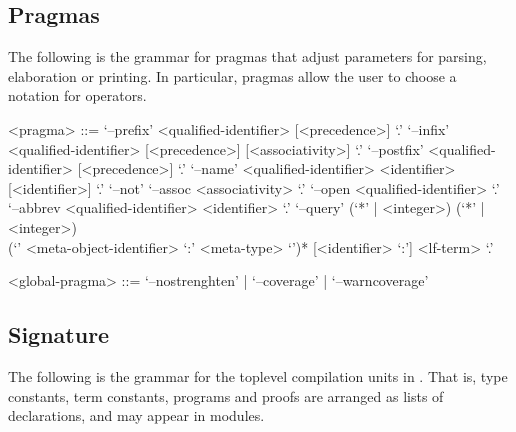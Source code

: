 \subsection{Pragmas}\label{section:syntax-pragmas}

The following is the grammar for pragmas that adjust parameters for parsing, elaboration or printing.
In particular, pragmas allow the user to choose a notation for operators.

\begin{grammar}
<pragma> ::= `--prefix' <qualified-identifier> [<precedence>] `.'
\alt `--infix' <qualified-identifier> [<precedence>] [<associativity>] `.'
\alt `--postfix' <qualified-identifier> [<precedence>] `.'
\alt `--name' <qualified-identifier> <identifier> [<identifier>] `.'
\alt `--not'
\alt `--assoc <associativity> `.'
\alt `--open <qualified-identifier> `.'
\alt `--abbrev <qualified-identifier> <identifier> `.'
\alt `--query' (`*' | <integer>) (`*' | <integer>)\\
(`{' <meta-object-identifier> `:' <meta-type> `}')* [<identifier> `:'] <lf-term> `.'

<global-pragma> ::= `--nostrenghten' | `--coverage' | `--warncoverage'
\end{grammar}

\subsection{Signature}\label{section:syntax-signature}

The following is the grammar for the toplevel compilation units in \Beluga.
That is, type constants, term constants, programs and proofs are arranged as lists of declarations, and may appear in modules.

